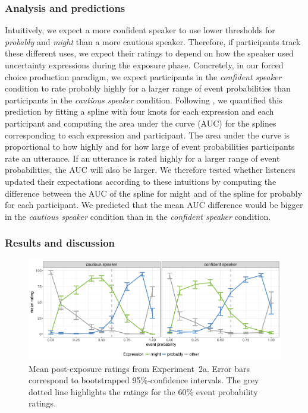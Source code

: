\documentclass[man, floatsintext]{apa6}
\begin{document}
\subsubsection{Analysis and predictions}  

Intuitively, we expect a more confident speaker to use lower thresholds for {\it probably} and {\it might} than a more cautious speaker.
Therefore, if participants track these different uses, we expect their ratings to depend on how the speaker used uncertainty expressions during the exposure phase. 
Concretely,  in our forced choice production paradigm, we expect participants in the \textit{confident speaker} condition to rate {\sc probably} highly for a larger range of event probabilities than participants
in the \textit{cautious speaker} condition. 
Following \cite{Yildirim2016}, we quantified this prediction by fitting a spline with four knots for each expression and each participant and computing the area 
under the curve (AUC) for the splines corresponding to each expression and participant. The area under the curve is proportional to how highly and for how large 
of event probabilities participants rate an utterance. If an utterance is rated highly for a larger range of event probabilities, the AUC will also be larger. 
We therefore tested whether listeners updated their expectations according to these intuitions by computing the difference between the AUC of the spline for 
{\sc might} and of the spline for {\sc probably} for each participant. We predicted that the mean AUC difference would be bigger in the 
\emph{cautious speaker} condition than in the \emph{confident speaker} condition.

\subsubsection{Results and discussion}

\begin{figure}
\includegraphics[width=\textwidth]{plots/exp-1-ratings.pdf}
\caption{Mean post-exposure ratings from Experiment~2a. Error bars correspond to bootstrapped 95\%-confidence intervals.  The grey dotted line highlights the ratings for the 60\% event probability ratings.  \label{fig:adaptation-results-prod}}
\end{figure}
\end{document}
